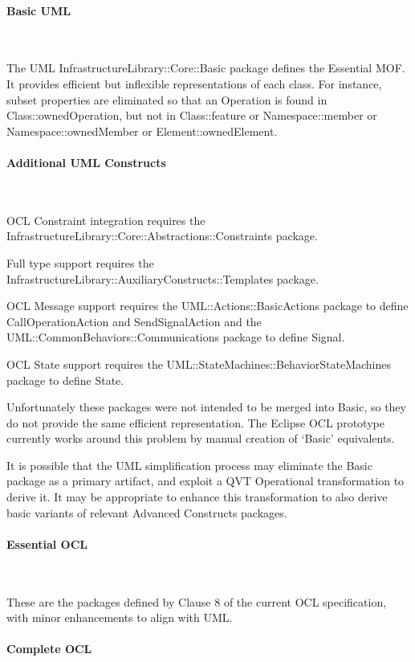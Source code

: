 \documentclass{eceasst}
\begin{document}
\paragraph{Basic UML}~

The UML InfrastructureLibrary::Core::Basic package defines the Essential MOF. It provides efficient but inflexible representations of each class. For instance, subset properties are eliminated so that an Operation is found in Class::ownedOperation, but not in Class::feature or Namespace::member or Namespace::ownedMember or Element::ownedElement.

\paragraph{Additional UML Constructs}~

OCL Constraint integration requires the InfrastructureLibrary::Core::Abstractions::Constraints package.

Full type support requires the InfrastructureLibrary::AuxiliaryConstructs::Templates package.

OCL Message support requires the UML::Actions::BasicActions package to define CallOperationAction and SendSignalAction and the UML::CommonBehaviors::Communications package to define Signal.

OCL State support requires the UML::StateMachines::BehaviorStateMachines package to define State.

Unfortunately these packages were not intended to be merged into Basic, so they do not provide the same efficient representation. The Eclipse OCL prototype currently works around this problem by manual creation of `Basic' equivalents.

It is possible that the UML simplification process\cite{UML-simple} may eliminate the Basic package as a primary artifact, and exploit a QVT Operational transformation to derive it. It may be appropriate to enhance this transformation to also derive basic variants of relevant Advanced Constructs packages.

\paragraph{Essential OCL}~

These are the packages defined by Clause 8 of the current OCL specification, with minor enhancements to align with UML. 

\paragraph{Complete OCL}~
\end{document}
